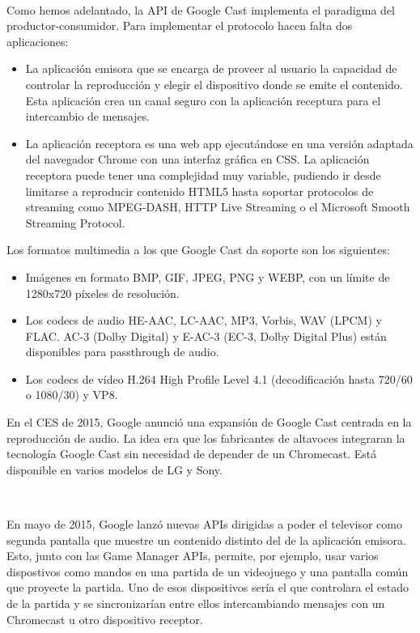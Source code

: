 \

Como hemos adelantado, la API de Google Cast implementa el paradigma del productor-consumidor. Para implementar el protocolo hacen falta dos aplicaciones:

\begin{itemize}

	\item La aplicación emisora que se encarga de proveer al usuario la capacidad de controlar la reproducción y elegir el dispositivo donde se emite el contenido.
	Esta aplicación crea un canal seguro con la aplicación receptura para el intercambio de mensajes.

	\item La aplicación receptora es una web app ejecutándose en una versión adaptada del navegador Chrome con una interfaz gráfica en CSS.
	La aplicación receptora puede tener una complejidad muy variable, pudiendo ir desde limitarse a reproducir contenido HTML5 hasta soportar protocolos de streaming como MPEG-DASH, HTTP Live Streaming o el Microsoft Smooth Streaming Protocol\cite{DLNA-Miracast}.

\end{itemize}

Los formatos multimedia a los que Google Cast da soporte son los siguientes:

\begin{itemize}

	\item Imágenes en formato BMP, GIF, JPEG, PNG y WEBP, con un límite de 1280x720 píxeles de resolución.

	\item Los codecs de audio HE-AAC, LC-AAC, MP3, Vorbis, WAV (LPCM) y FLAC. AC-3 (Dolby Digital) y E-AC-3 (EC-3, Dolby Digital Plus) están disponibles para passthrough de audio.

	\item Los codecs de vídeo H.264 High Profile Level 4.1 (decodificación hasta 720/60 o 1080/30) y VP8.

\end{itemize}

En el CES de 2015, Google anunció una expansión de Google Cast centrada en la reproducción de audio.
La idea era que los fabricantes de altavoces integraran la tecnología Google Cast sin necesidad de depender de un Chromecast.
Está disponible en varios modelos de LG y Sony.

\

En mayo de 2015, Google lanzó nuevas APIs dirigidas a poder el televisor como segunda pantalla que muestre un contenido distinto del de la aplicación emisora.
Esto, junto con las Game Manager APIs, permite, por ejemplo, usar varios dispostivos como mandos en una partida de un videojuego y una pantalla común que proyecte la partida.
Uno de esos dispositivos sería el que controlara el estado de la partida y se sincronizarían entre ellos intercambiando mensajes con un Chromecast u otro dispositivo receptor.

